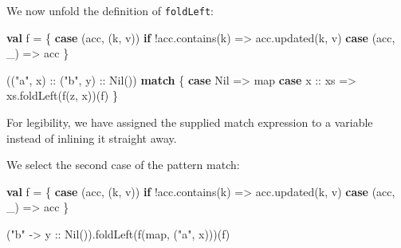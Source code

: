 \documentclass[ignorenonframetext,]{beamer}
\newenvironment{Shaded}{}{}
\newcommand{\FunctionTok}[1]{\textcolor[rgb]{0.02,0.16,0.49}{#1}}
\newcommand{\KeywordTok}[1]{\textcolor[rgb]{0.00,0.44,0.13}{\textbf{#1}}}
\newcommand{\NormalTok}[1]{#1}
\newcommand{\StringTok}[1]{\textcolor[rgb]{0.25,0.44,0.63}{#1}}
\begin{document}
\begin{frame}[fragile]

We now unfold the definition of \texttt{foldLeft}:

\begin{Shaded}
\begin{Highlighting}[]
\KeywordTok{val}\NormalTok{ f = \{}
  \KeywordTok{case}\NormalTok{ (acc, (k, v)) }\KeywordTok{if}\NormalTok{ !acc.}\FunctionTok{contains}\NormalTok{(k) => acc.}\FunctionTok{updated}\NormalTok{(k, v)}
  \KeywordTok{case}\NormalTok{ (acc, _)                          => acc}
\NormalTok{\}}

\NormalTok{((}\StringTok{"a"}\NormalTok{, x) :: (}\StringTok{"b"}\NormalTok{, y) :: }\FunctionTok{Nil}\NormalTok{()) }\KeywordTok{match}\NormalTok{ \{}
  \KeywordTok{case}\NormalTok{ Nil     => map}
  \KeywordTok{case}\NormalTok{ x :: xs => xs.}\FunctionTok{foldLeft}\NormalTok{(}\FunctionTok{f}\NormalTok{(z, x))(f)}
\NormalTok{\}}
\end{Highlighting}
\end{Shaded}

For legibility, we have assigned the supplied match expression to a
variable instead of inlining it straight away.

\end{frame}

\begin{frame}[fragile]

We select the second case of the pattern match:

\begin{Shaded}
\begin{Highlighting}[]
\KeywordTok{val}\NormalTok{ f = \{}
  \KeywordTok{case}\NormalTok{ (acc, (k, v)) }\KeywordTok{if}\NormalTok{ !acc.}\FunctionTok{contains}\NormalTok{(k) => acc.}\FunctionTok{updated}\NormalTok{(k, v)}
  \KeywordTok{case}\NormalTok{ (acc, _)                          => acc}
\NormalTok{\}}

\NormalTok{(}\StringTok{"b"}\NormalTok{ -> y :: }\FunctionTok{Nil}\NormalTok{()).}\FunctionTok{foldLeft}\NormalTok{(}\FunctionTok{f}\NormalTok{(map, (}\StringTok{"a"}\NormalTok{, x)))(f)}
\end{Highlighting}
\end{Shaded}

\end{frame}
\end{document}
